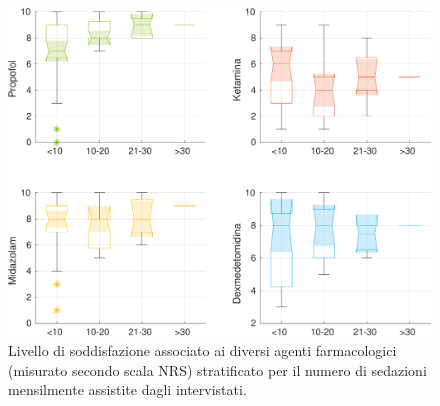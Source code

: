 \begin{figure}[h]
    \centering
    \includegraphics[width=1\textwidth]{Figure/qualita-stratificata.pdf}
    \caption{Livello di soddisfazione associato ai diversi agenti farmacologici (misurato secondo scala NRS) stratificato per il numero di sedazioni mensilmente assistite dagli intervistati.}
    \label{fig:qualitastratificata}
\end{figure}